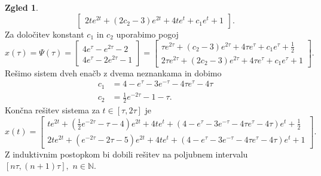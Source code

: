 \documentclass[12pt,a4paper]{amsart}
\theoremstyle{definition} %
\newtheorem{zgled}[definicija]{Zgled}
\theoremstyle{plain} %
\newcommand{\N}{\mathbb N}
\begin{document}
\begin{zgled}
\[\begin{bmatrix}
        2te^{2t}+(2c_2-3)e^{2t}+4te^{t}+c_1e^t+1 
    \end{bmatrix}.\]
    Za določitev konstant $c_1$ in $c_2$ uporabimo pogoj
    \[x(\tau) =\Psi(\tau)=\begin{bmatrix}
        4e^{\tau}-e^{2\tau}-2  \\
        4e^{\tau}-2e^{2\tau}-1  
    \end{bmatrix} = \begin{bmatrix}
        \tau e^{2\tau}+(c_2-3)e^{2\tau}+4\tau e^\tau+c_1e^\tau+\frac{1}{2}  \\
        2\tau e^{2\tau}+(2c_2-3)e^{2\tau}+4\tau e^{\tau}+c_1e^\tau+1 
    \end{bmatrix}. \]
    Rešimo sistem dveh enačb z dvema neznankama in dobimo 
    \begin{equation*}
        \begin{split}
            c_1 &= 4-e^{\tau}-3e^{-\tau}-4\tau e^{\tau}-4\tau \\
            c_2 &= \frac{1}{2}e^{-2\tau}-1-\tau.
        \end{split}
    \end{equation*}
    Končna rešitev sistema za $t\in[\tau,2\tau]$ je
    \[x(t)= \begin{bmatrix}
        te^{2t}+(\frac{1}{2}e^{-2\tau}-\tau-4)e^{2t}+4te^t+(4-e^{\tau}-3e^{-\tau}-4\tau e^{\tau}-4\tau)e^t+\frac{1}{2}  \\
        2te^{2t}+(e^{-2\tau}-2\tau-5)e^{2t}+4te^{t}+(4-e^{\tau}-3e^{-\tau}-4\tau e^{\tau}-4\tau)e^t+1 
    \end{bmatrix}.\]
    Z induktivnim postopkom bi dobili rešitev na poljubnem intervalu $[n\tau, (n+1)\tau],$ $n\in\N.$

\end{zgled}
\end{document}
